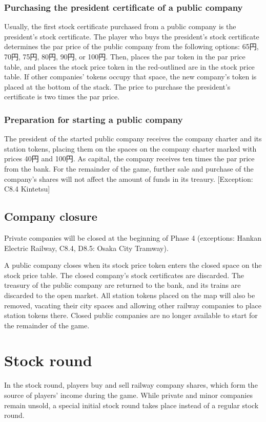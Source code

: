 \documentclass{article}
\begin{document}
\begin{CJK}{UTF8}{min}
\begin{multicols}{2}
\subsubsection{Purchasing the president certificate of a public company}
Usually, the first stock certificate purchased from a public company
is the president's stock certificate. The player who buys the
president's stock certificate determines the par price of the public
company from the following options: 65円, 70円, 75円, 80円, 90円, or
100円. Then, places the par token in the par price table, and places
the stock price token in the red-outlined are in the stock price
table. If other companies' tokens occupy that space, the new company's
token is placed at the bottom of the stack. The price to purchase the
president's certificate is two times the par price.

\subsubsection{Preparation for starting a public company}
The president of the started public company receives the company
charter and its station tokens, placing them on the spaces on the
company charter marked with prices 40円 and 100円. As capital,
the company receives ten times the par price from the bank. For the
remainder of the game, further sale and purchase of the company's
shares will not affect the amount of funds in its treaury. [Exception:
C8.4 Kintetsu]

\subsection{Company closure}
Private companies will be closed at the beginning of Phase 4
(exceptions: Hankan Electric Railway, C8.4, D8.5: Osaka City Tramway).

A public company closes when its stock price token enters the closed
space on the stock price table. The closed company's stock
certificates are discarded. The treasury of the public company are
returned to the bank, and its trains are discarded to the open
market. All station tokens placed on the map will also be removed,
vacating their city spaces and allowing other railway companies to
place station tokens there. Closed public companies are no longer
available to start for the remainder of the game.



\section{Stock round}
In the stock round, players buy and sell railway company shares, which
form the source of players' income during the game. While private and
minor companies remain unsold, a special initial stock round takes
place instead of a regular stock round.


\end{multicols}
\end{CJK}
\end{document}
